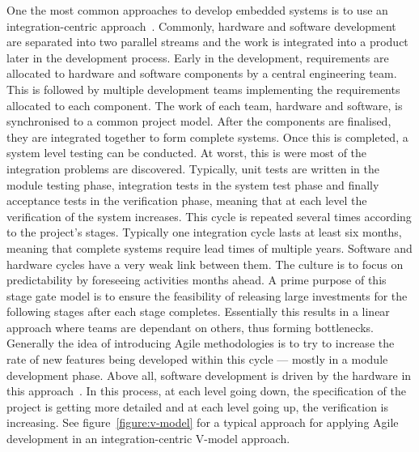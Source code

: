 \documentclass[english]{tktltiki2}
\begin{document}
One the most common approaches to develop embedded systems is to use an integration-centric approach~\cite{EB12, EHS14}. Commonly, hardware and software development are separated into two parallel streams and the work is integrated into a product later in the development process. Early in the development, requirements are allocated to hardware and software components by a central engineering team. This is followed by multiple development teams implementing the requirements allocated to each component. The work of each team, hardware and software, is synchronised to a common project model. After the components are finalised, they are integrated together to form complete systems. Once this is completed, a system level testing can be conducted. At worst, this is were most of the integration problems are discovered. Typically, unit tests are written in the module testing phase, integration tests in the system test phase and finally acceptance tests in the verification phase, meaning that at each level the verification of the system increases. This cycle is repeated several times according to the project’s stages. Typically one integration cycle lasts at least six months, meaning that complete systems require lead times of multiple years. Software and hardware cycles have a very weak link between them. The culture is to focus on predictability by foreseeing activities months ahead. A prime purpose of this stage gate model is to ensure the feasibility of releasing large investments for the following stages after each stage completes. Essentially this results in a linear approach where teams are dependant on others, thus forming bottlenecks. Generally the idea of introducing Agile methodologies is to try to increase the rate of new features being developed within this cycle — mostly in a module development phase. Above all, software development is driven by the hardware in this approach~\cite{EB12}. In this process, at each level going down, the specification of the project is getting more detailed and at each level going up, the verification is increasing. See figure~\ref{figure:v-model} for a typical approach for applying Agile development in an integration-centric V-model approach.
\end{document}
